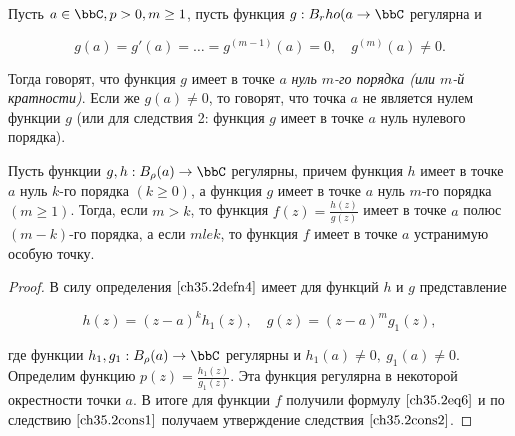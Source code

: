 \begin{defn} \label{ch35.2defn4}
Пусть $a \in \bbC, p > 0, m \ge 1$, пусть функция $g : B_rho(a \to \bbC$ регулярна и

$$
g(a) = g'(a) = \ldots = g^{(m - 1)}(a) = 0, \quad g^{(m)}(a) \not= 0.
$$

Тогда говорят, что функция $g$ имеет в точке $a$ \textit{нуль $m$-го порядка (или $m$-й кратности)}. Если же $g(a) \not= 0$, то говорят, что точка $a$ не является нулем функции $g$ (или для следствия 2: функция $g$ имеет в точке $a$ нуль нулевого порядка).
\end{defn}

\begin{cons} \label{ch35.2cons2}
Пусть функции $g,h : B_\rho(a) \to \bbC$ регулярны, причем функция $h$ имеет в точке $a$ нуль $k$-го порядка $(k \ge 0)$, а функция $g$ имеет в точке $a$ нуль $m$-го порядка $(m \ge 1)$. Тогда, если
$m > k$, то функция $f(z) = \frac{h(z)}{g(z)}$ имеет в точке $a$ полюс $(m - k)$-го порядка, а если $m le k$, то функция $f$ имеет в точке $a$ устранимую особую точку.
\end{cons}

\begin{proof}
В силу определения $\eqref{ch35.2defn4}$ имеет для функций $h$ и $g$ представление

$$
h(z) = (z - a)^k h_1(z), \quad g(z) = (z - a)^m g_1(z),
$$

где функции $h_1,g_1 : B_\rho(a) \to \bbC$ регулярны и $h_1(a) \not= 0, \: g_1(a) \not= 0$.
Определим функцию $p(z) = \frac{h_1(z)}{g_1(z)}$. Эта функция регулярна в некоторой окрестности точки $a$. В итоге для функции $f$ получили формулу $\eqref{ch35.2eq6}$ и по следствию $\eqref{ch35.2cons1}$ получаем утверждение следствия $\eqref{ch35.2cons2}$.

\end{proof}

